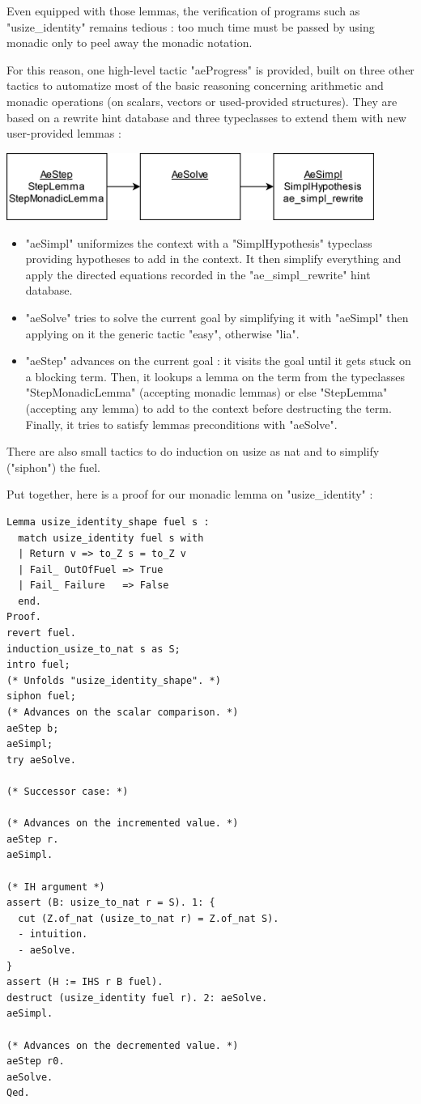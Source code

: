 \documentclass{article}
\begin{document}
Even equipped with those lemmas, the verification of programs such as "usize\_identity" remains tedious : too much time must be passed by using monadic only to peel away the monadic notation.

For this reason, one high-level tactic "aeProgress" is provided, built on three other tactics to automatize most of the basic reasoning concerning arithmetic and monadic operations (on scalars, vectors or used-provided structures). They are based on a rewrite hint database and three typeclasses to extend them with new user-provided lemmas :

\includegraphics[width=0.9\textwidth]{Readme-tactics.png}

\begin{itemize}
    \item "aeSimpl" uniformizes the context with a "SimplHypothesis" typeclass providing hypotheses to add in the context. It then simplify everything and apply the directed equations recorded in the "ae\_simpl\_rewrite" hint database.
    \item "aeSolve" tries to solve the current goal by simplifying it with "aeSimpl" then applying on it the generic tactic "easy", otherwise "lia".
    \item "aeStep" advances on the current goal : it visits the goal until it gets stuck on a blocking term. Then, it lookups a lemma on the term from the typeclasses "StepMonadicLemma" (accepting monadic lemmas) or else "StepLemma" (accepting any lemma) to add to the context before destructing the term. Finally, it tries to satisfy lemmas preconditions with "aeSolve".
\end{itemize}

\medskip

There are also small tactics to do induction on usize as nat and to simplify ("siphon") the fuel.

Put together, here is a proof for our monadic lemma on "usize\_identity" :

\begin{verbatim}
Lemma usize_identity_shape fuel s :
  match usize_identity fuel s with
  | Return v => to_Z s = to_Z v
  | Fail_ OutOfFuel => True
  | Fail_ Failure   => False
  end.
Proof.
revert fuel.
induction_usize_to_nat s as S;
intro fuel;
(* Unfolds "usize_identity_shape". *)
siphon fuel;
(* Advances on the scalar comparison. *)
aeStep b;
aeSimpl;
try aeSolve.

(* Successor case: *)

(* Advances on the incremented value. *)
aeStep r.
aeSimpl.

(* IH argument *)
assert (B: usize_to_nat r = S). 1: {
  cut (Z.of_nat (usize_to_nat r) = Z.of_nat S).
  - intuition.
  - aeSolve.
}
assert (H := IHS r B fuel).
destruct (usize_identity fuel r). 2: aeSolve.
aeSimpl.

(* Advances on the decremented value. *)
aeStep r0.
aeSolve.
Qed.
\end{verbatim}
\end{document}
